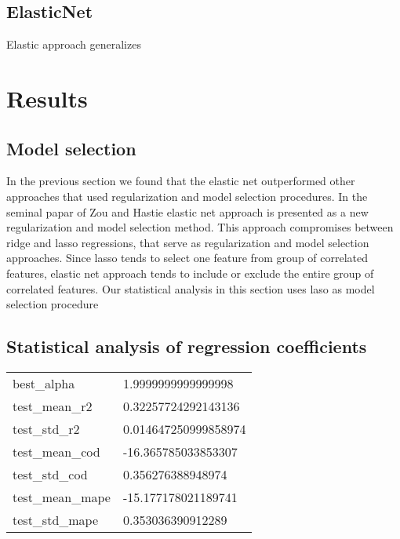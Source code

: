\documentclass{article}
\begin{document}
\subsection{ElasticNet}

Elastic approach generalizes 
\section{Results}

\subsection{Model selection}
In the  previous section we found that the elastic net outperformed other approaches that used regularization and model selection procedures. In the seminal papar of Zou and Hastie elastic net approach is presented as  a new regularization and model selection method. This approach compromises between ridge and lasso regressions, that serve as regularization and model selection approaches. Since lasso tends to select one feature from group of correlated features, elastic net approach tends to include or exclude the entire group of correlated features. Our statistical analysis in this section uses laso as model selection procedure 

\subsection{Statistical analysis of regression coefficients}
\begin{table}[!ht]
  \centering
  \begin{tabular}{|l|l|}
  \hline
      best\_alpha & 1.9999999999999998 \\
      test\_mean\_r2 & 0.32257724292143136 \\
      test\_std\_r2 & 0.014647250999858974 \\
      test\_mean\_cod & -16.365785033853307 \\
      test\_std\_cod & 0.356276388948974 \\
      test\_mean\_mape & -15.177178021189741 \\
      test\_std\_mape & 0.353036390912289 \\
  \end{tabular}
\end{table}


\printbibliography
\end{document}
